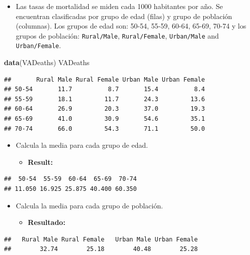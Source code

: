 \documentclass[]{book}
\newenvironment{Shaded}{\begin{snugshade}}{\end{snugshade}}
\newcommand{\KeywordTok}[1]{\textcolor[rgb]{0.13,0.29,0.53}{\textbf{#1}}}
\newcommand{\NormalTok}[1]{#1}
\providecommand{\tightlist}{%
  \setlength{\itemsep}{0pt}\setlength{\parskip}{0pt}}
\begin{document}
\begin{itemize}
\tightlist
\item
  Las tasas de mortalidad se miden cada 1000 habitantes por año. Se
  encuentran clasificadas por grupo de edad (filas) y grupo de población
  (columnas). Los grupos de edad son: 50-54, 55-59, 60-64, 65-69, 70-74
  y los grupos de población: \texttt{Rural/Male}, \texttt{Rural/Female},
  \texttt{Urban/Male} and \texttt{Urban/Female}.
\end{itemize}

\begin{Shaded}
\begin{Highlighting}[]
\KeywordTok{data}\NormalTok{(VADeaths)}
\NormalTok{VADeaths}
\end{Highlighting}
\end{Shaded}

\begin{verbatim}
##       Rural Male Rural Female Urban Male Urban Female
## 50-54       11.7          8.7       15.4          8.4
## 55-59       18.1         11.7       24.3         13.6
## 60-64       26.9         20.3       37.0         19.3
## 65-69       41.0         30.9       54.6         35.1
## 70-74       66.0         54.3       71.1         50.0
\end{verbatim}

\begin{itemize}
\item
  Calcula la media para cada grupo de edad.

  \begin{itemize}
  \tightlist
  \item
    \textbf{Result:}
  \end{itemize}
\end{itemize}

\begin{verbatim}
##  50-54  55-59  60-64  65-69  70-74 
## 11.050 16.925 25.875 40.400 60.350
\end{verbatim}

\begin{itemize}
\item
  Calcula la media para cada grupo de población.

  \begin{itemize}
  \tightlist
  \item
    \textbf{Resultado:}
  \end{itemize}
\end{itemize}

\begin{verbatim}
##   Rural Male Rural Female   Urban Male Urban Female 
##        32.74        25.18        40.48        25.28
\end{verbatim}
\end{document}
